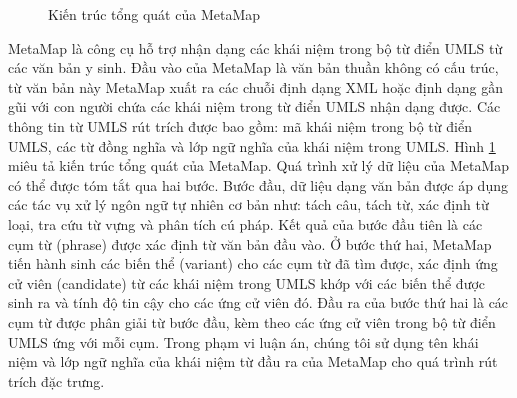 \begin{figure}
\centering
{}
\caption{Kiến trúc tổng quát của MetaMap\label{metamapstructure}}
\end{figure}

MetaMap là công cụ hỗ trợ nhận dạng các khái niệm trong bộ từ điển UMLS từ các văn bản y sinh. Đầu vào của MetaMap là văn bản thuần không có cấu trúc, từ văn bản này MetaMap xuất ra các chuỗi định dạng XML hoặc định dạng gần gũi với con người chứa các khái niệm trong từ điển UMLS nhận dạng được. Các thông tin từ UMLS rút trích được bao gồm: mã khái niệm trong bộ từ điển UMLS, các từ đồng nghĩa và lớp ngữ nghĩa của khái niệm trong UMLS. Hình \ref{metamapstructure} miêu tả kiến trúc tổng quát của MetaMap. Quá trình xử lý dữ liệu của MetaMap có thể được tóm tắt qua hai bước. Bước đầu, dữ liệu dạng văn bản được áp dụng các tác vụ xử lý ngôn ngữ tự nhiên cơ bản như: tách câu, tách từ, xác định từ loại, tra cứu từ vựng và phân tích cú pháp. Kết quả của bước đầu tiên là các cụm từ (phrase) được xác định từ văn bản đầu vào. Ở bước thứ hai, MetaMap tiến hành sinh các biến thể (variant) cho các cụm từ đã tìm được, xác định ứng cử viên (candidate) từ các khái niệm trong UMLS khớp với các biến thể được sinh ra và tính độ tin cậy cho các ứng cử viên đó. Đầu ra của bước thứ hai là các cụm từ được phân giải từ bước đầu, kèm theo các ứng cử viên trong bộ từ điển UMLS ứng với mỗi cụm. Trong phạm vi luận án, chúng tôi sử dụng tên khái niệm và lớp ngữ nghĩa của khái niệm từ đầu ra của MetaMap cho quá trình rút trích đặc trưng.

